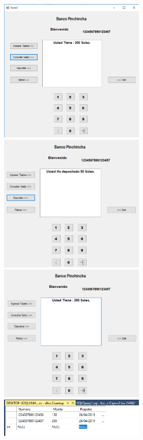 \begin{enumerate}[1.]
\begin{enumerate}[a)]
\begin{figure}[H]
\begin{center}
		\includegraphics[width=7cm]{./Imagenes/img19}\\

		\includegraphics[width=7cm]{./Imagenes/img20}\\

		\includegraphics[width=7cm]{./Imagenes/img21}\\

		\includegraphics[width=7cm]{./Imagenes/img22}\\


\end{center}
\end{figure}
\end{enumerate}
\end{enumerate}
